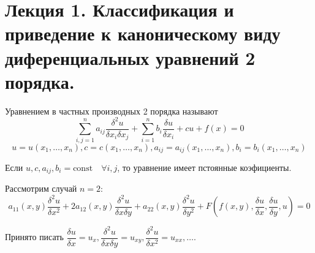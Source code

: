 \section*{Лекция 1. Классификация и приведение к каноническому виду диференциальных уравнений 2 порядка.}

\begin{definition}
    Уравнением в частных производных 2 порядка называют
    $$ \sum_{i, j = 1}^{n} a_{ij} \dfrac{\delta ^ 2 u}{\delta x_i \delta x_j} + \sum_{i = 1}^{n} b_i \dfrac{\delta u}{\delta x_i} + cu + f(x) = 0 $$
    $$ u = u(x_1, \ldots, x_n), c = c(x_1, \ldots, x_n), a_{ij} = a_{ij} (x_1, \ldots, x_n), b_i = b_i(x_1, \ldots, x_n) $$
\end{definition}
Если $ u, c, a_{ij}, b_{i} = \text{const} \quad \forall i, j $, то
уравнение имеет пстоянные коэфициенты. \par
Рассмотрим случай $n = 2$:
$$ a_{11} (x, y) \dfrac{\delta ^ 2 u}{\delta x^2} + 2 a_{12}(x, y) \dfrac{\delta ^ 2 u}{\delta x \delta y} + a_{22} (x, y) \dfrac{\delta ^ 2 u}{\delta y^2} + F(f(x, y), \dfrac{\delta u}{\delta x}, \dfrac{\delta u}{\delta y}, u) = 0 $$
\begin{remark}
    Принято писать $\dfrac{\delta u}{\delta x} = u_x, \dfrac{\delta ^ 2 u}{\delta x \delta y} = u_{xy}, \dfrac{\delta ^ 2 u}{\delta x ^ 2} = u_{xx}, \ldots. $
\end{remark}

